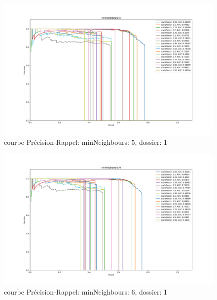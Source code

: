 \documentclass[a4paper,11pt]{article}
\begin{document}
	\begin{figure}[H]
	    \begin{center}
		\includegraphics[scale = 0.4]{images/courbes/folder_01_minN_5.png}
		\caption{courbe Précision-Rappel: minNeighbours: 5, dossier: 1}
		\label{fig:minN_2}
	    \end{center}
	\end{figure}

	\begin{figure}[H]
	    \begin{center}
		\includegraphics[scale = 0.4]{images/courbes/folder_01_minN_6.png}
		\caption{courbe Précision-Rappel: minNeighbours: 6, dossier: 1}
		\label{fig:minN_2}
	    \end{center}
	\end{figure}
\end{document}
